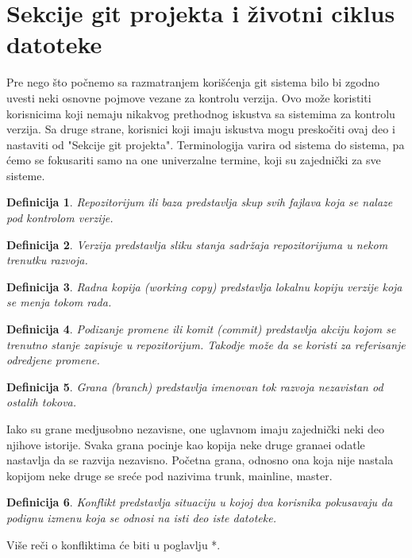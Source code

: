 \documentclass[a4paper]{article}
\newtheorem{definicija}{Definicija}[section]
\begin{document}
{\section{Sekcije git projekta i životni ciklus datoteke}
\label{zivotni_ciklus}
Pre nego što počnemo sa razmatranjem korišćenja git sistema bilo bi zgodno uvesti neki osnovne pojmove vezane za kontrolu verzija. Ovo može koristiti korisnicima koji nemaju nikakvog prethodnog iskustva sa sistemima za kontrolu verzija. Sa druge strane, korisnici koji imaju iskustva mogu preskočiti ovaj deo i nastaviti od "Sekcije git projekta". Terminologija varira od sistema do sistema, pa ćemo se fokusariti samo na one univerzalne termine, koji su zajednički za sve sisteme.

\begin{definicija}
Repozitorijum ili baza predstavlja skup svih fajlava koja se nalaze pod kontrolom verzije.
\end{definicija}

\begin{definicija}
Verzija predstavlja sliku stanja sadržaja repozitorijuma u nekom trenutku razvoja.
\end{definicija}

\begin{definicija}
Radna kopija (working copy) predstavlja lokalnu kopiju verzije koja se menja tokom rada.
\end{definicija}

\begin{definicija}
Podizanje promene ili komit (commit) predstavlja akciju kojom se trenutno stanje zapisuje u repozitorijum. Takodje može da se koristi za referisanje odredjene promene.
\end{definicija}

\begin{definicija}
Grana (branch) predstavlja imenovan tok razvoja nezavistan od ostalih tokova.
\end{definicija}
Iako su grane medjusobno nezavisne, one uglavnom imaju zajednički neki deo njihove istorije. Svaka grana pocinje kao kopija neke druge granaei odatle nastavlja da se razvija nezavisno. Početna grana, odnosno ona koja nije nastala kopijom neke druge se sreće pod nazivima trunk, mainline, master.

\begin{definicija}
Konflikt predstavlja situaciju u kojoj dva korisnika pokusavaju da podignu izmenu koja se odnosi na isti deo iste datoteke.
\end{definicija}
Više reči o konfliktima će biti u poglavlju *.


}
\end{document}
